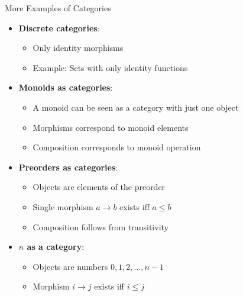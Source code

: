 \documentclass{beamer}
\begin{document}
\begin{frame}{More Examples of Categories}
    \begin{itemize}
        \item \textbf{Discrete categories}:
            \begin{itemize}
                \item Only identity morphisms
                \item Example: Sets with only identity functions
            \end{itemize}
        \item \textbf{Monoids as categories}:
            \begin{itemize}
                \item A monoid can be seen as a category with just one object
                \item Morphisms correspond to monoid elements
                \item Composition corresponds to monoid operation
            \end{itemize}
        \item \textbf{Preorders as categories}:
            \begin{itemize}
                \item Objects are elements of the preorder
                \item Single morphism $a \to b$ exists iff $a \leq b$
                \item Composition follows from transitivity
            \end{itemize}
        \item \textbf{$n$ as a category}:
            \begin{itemize}
                \item Objects are numbers $0, 1, 2, \ldots, n-1$
                \item Morphism $i \to j$ exists iff $i \leq j$
            \end{itemize}
    \end{itemize}
\end{frame}
\end{document}
